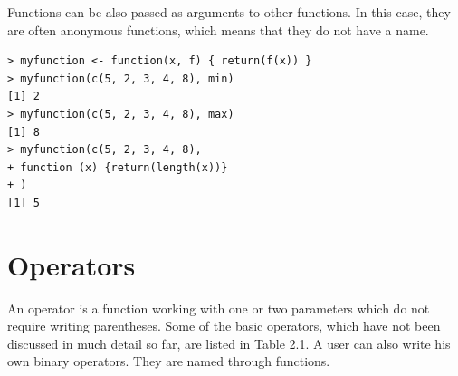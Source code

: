 Functions can be also passed as arguments to other functions. In this case,
they are often anonymous functions, which means that they do not have a name.

\begin{verbatim}
> myfunction <- function(x, f) { return(f(x)) }
> myfunction(c(5, 2, 3, 4, 8), min)
[1] 2
> myfunction(c(5, 2, 3, 4, 8), max)
[1] 8
> myfunction(c(5, 2, 3, 4, 8),
+ function (x) {return(length(x))}
+ )
[1] 5
\end{verbatim}

\section{Operators}

An operator is a function working with one or two parameters which do not
require writing parentheses. Some of the basic operators, which have not been
discussed in much detail so far, are listed in Table 2.1. A user can also write his
own binary operators. They are named %
through functions.

